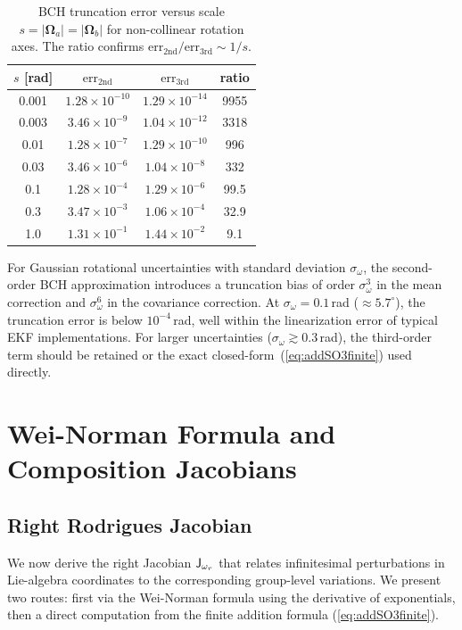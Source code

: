 \documentclass[journal]{IEEEtran}
\newcommand{\bfOmega}{\boldsymbol{\Omega}}
\newcommand{\Jom}{\mathsf{J}_\mathnormal{\omega_r}}
\begin{document}
\begin{table}[ht]
\centering
\caption{BCH truncation error versus scale $s = |\bfOmega_a| = |\bfOmega_b|$
for non-collinear rotation axes.
The ratio confirms $\mathrm{err}_{2\mathrm{nd}}/\mathrm{err}_{3\mathrm{rd}} \sim 1/s$.}
\label{tab:bchorder}
\begin{tabular}{c|cc|c}
$s$ [rad] & $\mathrm{err}_{2\mathrm{nd}}$ & $\mathrm{err}_{3\mathrm{rd}}$ & ratio \\
\hline
0.001 & $1.28\times10^{-10}$ & $1.29\times10^{-14}$ & 9955 \\
0.003 & $3.46\times10^{-9}$  & $1.04\times10^{-12}$ & 3318 \\
0.01  & $1.28\times10^{-7}$  & $1.29\times10^{-10}$ & 996 \\
0.03  & $3.46\times10^{-6}$  & $1.04\times10^{-8}$  & 332 \\
0.1   & $1.28\times10^{-4}$  & $1.29\times10^{-6}$  & 99.5 \\
0.3   & $3.47\times10^{-3}$  & $1.06\times10^{-4}$  & 32.9 \\
1.0   & $1.31\times10^{-1}$  & $1.44\times10^{-2}$  & 9.1 \\
\end{tabular}
\end{table}

For Gaussian rotational uncertainties with standard deviation
$\sigma_\omega$, the second-order BCH approximation introduces a
truncation bias of order $\sigma_\omega^3$ in the mean correction
and $\sigma_\omega^6$ in the covariance correction.
At $\sigma_\omega = 0.1$\,rad ($\approx 5.7^\circ$), the truncation
error is below $10^{-4}$\,rad, well within the linearization error
of typical EKF implementations.
For larger uncertainties ($\sigma_\omega \gtrsim 0.3$\,rad),
the third-order term should be retained or the exact
closed-form~(\ref{eq:addSO3finite}) used directly.

\section{Wei-Norman Formula and Composition Jacobians}
\label{app:weinorman}

\subsection{Right Rodrigues Jacobian}
We now derive the right Jacobian $\Jom$ that relates infinitesimal
perturbations in Lie-algebra coordinates to the corresponding group-level variations.
We present two routes: first via the Wei-Norman formula using the derivative of
exponentials, then a direct computation from the finite addition formula
(\ref{eq:addSO3finite}).
\end{document}
